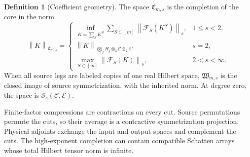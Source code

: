 \documentclass[11pt,a4paper]{amsart}
\numberwithin{equation}{section}
\theoremstyle{definition}
\newtheorem{definition}[theorem]{Definition}
\theoremstyle{remark}
\newcommand{\cC}{\mathcal C}
\newcommand{\cE}{\mathcal E}
\newcommand{\Sch}{\mathcal S}
\newcommand{\Coeff}{\mathfrak C}
\newcommand{\Wc}{\mathfrak W}
\newcommand{\Flat}{\mathcal F}
\newcommand{\norm}[1]{\left\lVert#1\right\rVert}
\begin{document}
\begin{definition}[Coefficient geometry]\label{def:cutspace}
The space $\Coeff_{m,s}$ is the completion of the core in the norm
\begin{equation}\label{eq:cutnorm}
 \norm K_{\Coeff_{m,s}}=
 \begin{cases}
 \displaystyle\inf_{K=\sum_SK^S}\sum_{S\subset[m]}\norm{\Flat_S(K^S)}_s,&1\le s<2,\\[2mm]
 \norm K_{\bigotimes_jH_j\otimes_2\overline{\cC}\otimes_2\cE},&s=2,\\[1mm]
 \displaystyle\max_{S\subset[m]}\norm{\Flat_S(K)}_s,&2<s<\infty.
 \end{cases}
\end{equation}
When all source legs are labeled copies of one real Hilbert space, $\Wc_{m,s}$ is the closed image of source symmetrization, with the inherited norm. At degree zero, the space is $\Sch_s(\cC,\cE)$.
\end{definition}

Finite-factor compressions are contractions on every cut. Source permutations permute the cuts, so their average is a contractive symmetrization projection. Physical adjoints exchange the input and output spaces and complement the cuts. The high-exponent completion can contain compatible Schatten arrays whose total Hilbert tensor norm is infinite.
\end{document}
